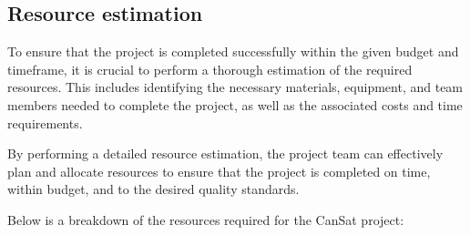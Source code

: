 \documentclass[11pt]{article}
\begin{document}
\subsection{Resource estimation}
To ensure that the project is completed successfully within the given budget and timeframe, it is crucial to perform a thorough estimation of the required resources. This includes identifying the necessary materials, equipment, and team members needed to complete the project, as well as the associated costs and time requirements. 

By performing a detailed resource estimation, the project team can effectively plan and allocate resources to ensure that the project is completed on time, within budget, and to the desired quality standards. 

Below is a breakdown of the resources required for the CanSat project:
\end{document}
